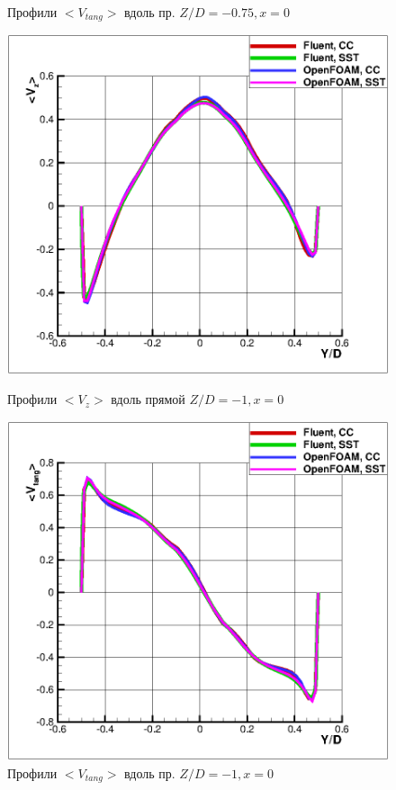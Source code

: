 \begin{figure}[h]
\begin{minipage}{0.475\linewidth}
		\caption{Профили $<V_{tang}>$ вдоль пр. $Z/D=-0.75, x=0$}
		\label{fig:tangentialCyclone}
	\end{minipage}
	\begin{minipage}{0.475\linewidth}
		\includegraphics[scale=0.66]{axialCyclone2}
		\caption{Профили $<V_{z}>$ вдоль прямой $Z/D=-1, x=0$}
		\label{fig:axialCyclone2}
	\end{minipage}
	\hspace{0.5em}
	\begin{minipage}{0.475\linewidth}
		\includegraphics[scale=0.66]{tangentialCyclone2}
		\caption{Профили $<V_{tang}>$ вдоль пр. $Z/D=-1, x=0$}
		\label{fig:tangentialCyclone2}
	\end{minipage}
\end{figure}
\clearpage

